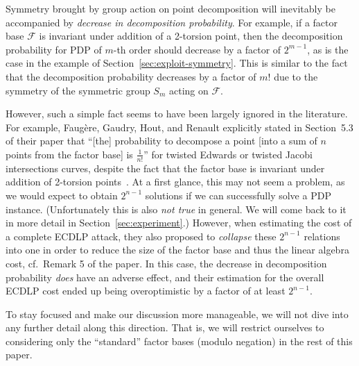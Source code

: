 Symmetry brought by group action on point decomposition will
inevitably be accompanied by \emph{decrease in decomposition
  probability}.
%
For example, if a factor base $\mathcal F$ is invariant under addition
of a 2-torsion point, then the decomposition probability for PDP of
$m$-th order should decrease by a factor of $2^{m-1}$, as is the case
in the example of Section~\ref{sec:exploit-symmetry}.
%
This is similar to the fact that the decomposition probability
decreases by a factor of $m!$ due to the symmetry of the symmetric
group $S_m$ acting on $\mathcal F$.

However, such a simple fact seems to have been largely ignored in the
literature.
%
For example, Faug\`ere, Gaudry, Hout, and Renault explicitly stated in
Section~5.3 of their paper that ``[the] probability to decompose a
point [into a sum of $n$ points from the factor base] is
$\frac{1}{n!}$'' for twisted Edwards or twisted Jacobi intersections
curves, despite the fact that the factor base is invariant under
addition of 2-torsion points~\cite{DBLP:journals/joc/FaugereGHR14}.
%
At a first glance, this may not seem a problem, as we would expect to
obtain $2^{n-1}$ solutions if we can successfully solve a PDP
instance.
%
(Unfortunately this is also \emph{not true} in general.  We will come
back to it in more detail in Section~\ref{sec:experiment}.)
% 
However, when estimating the cost of a complete ECDLP attack, they
also proposed to \emph{collapse} these $2^{n-1}$ relations into one in
order to reduce the size of the factor base and thus the linear
algebra cost, cf.~Remark 5 of the paper.
%
In this case, the decrease in decomposition probability \emph{does}
have an adverse effect, and their estimation for the overall ECDLP
cost ended up being overoptimistic by a factor of at least $2^{n-1}$.

To stay focused and make our discussion more manageable, we will not
dive into any further detail along this direction.
%
That is, we will restrict ourselves to considering only the
``standard'' factor bases (modulo negation) in the rest of this paper.


